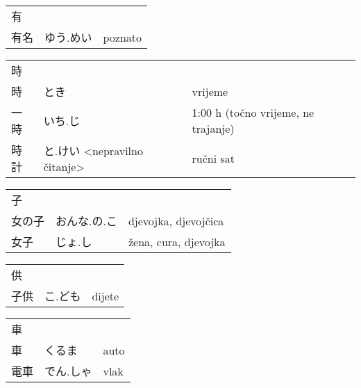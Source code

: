 

\newenvironment{dictentry}[1]{
	\begin{tabular}{p{2cm} p{3cm} p{10cm}}
		#1 &&\\
}{
	\end{tabular}
	\vspace{20pt}
}

\newcommand{\example}[3]{
	\hspace*{\fill}#1 & #2 & #3\\
}

\author{ロボット君}


\begin{dictentry}{有}
\example{有名}{ゆう.めい}{poznato}
\end{dictentry}

\begin{dictentry}{時}
\example{時}{とき}{vrijeme}
\example{一時}{いち.じ}{1:00 h (točno vrijeme, ne trajanje)}
\example{時計}{と.けい <nepravilno čitanje>}{ručni sat}
\end{dictentry}

\begin{dictentry}{子}
\example{女の子}{おんな.の.こ}{djevojka, djevojčica}
\example{女子}{じょ.し}{žena, cura, djevojka}
\end{dictentry}

\begin{dictentry}{供}
\example{子供}{こ.ども}{dijete}
\end{dictentry}

\begin{dictentry}{車}
\example{車}{くるま}{auto}
\example{電車}{でん.しゃ}{vlak}
\end{dictentry}

